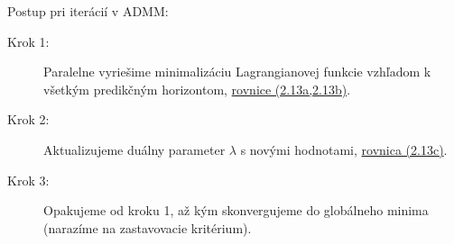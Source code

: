 Postup pri iterácií v ADMM:
\begin{description}
	\item[Krok 1:] {Paralelne vyriešime minimalizáciu Lagrangianovej funkcie vzhľadom k všetkým predikčným horizontom, \hyperref[math:ADMM_iteracie]{rovnice (2.13a,2.13b)}.}
	\item[Krok 2:] {Aktualizujeme duálny parameter $\lambda$ s novými hodnotami, \hyperref[math:ADMM_iteracie]{rovnica (2.13c)}.}
	\item[Krok 3:] {Opakujeme od kroku 1, až kým skonvergujeme do globálneho minima (narazíme na zastavovacie kritérium).}
\end{description}

